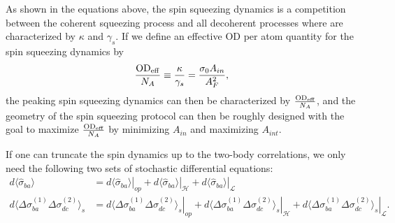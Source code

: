 \documentclass[preprint,aps,pra,onecolumn,superscriptaddress]{revtex4-1} %
\newcommand{\expect}[1]{\big\langle #1 \big\rangle}
\begin{document}
As shown in the equations above, the spin squeezing dynamics is a competition between the coherent squeezing process and all decoherent processes where are characterized by $\kappa$ and $\gamma_s$. 
If we define an effective OD per atom quantity for the spin squeezing dynamics by
\begin{align}
\frac{\mathrm{OD}_{\rm eff}}{N_A} \equiv \frac{\kappa}{\gamma_s}=\frac{\sigma_0A_{in}}{A_F^2},
\end{align}
the peaking spin squeezing dynamics can then be characterized by $\frac{\mathrm{OD}_{\rm eff}}{N_A}$, and the geometry of the spin squeezing protocol can then be roughly designed with the goal to maximize $\frac{\mathrm{OD}_{\rm eff}}{N_A}$ by minimizing $A_{in}$ and maximizing $A_{int}$.  


If one can truncate the spin dynamics up to the two-body correlations, we only need the following two sets of stochastic differential equations:
\begin{subequations}
\begin{align}
d\expect{\hat{\sigma}_{ba}} &=\left. d{\expect{\hat{\sigma}_{ba}}}\right|_{op} + \left. d{\expect{\hat{\sigma}_{ba}}}\right|_{\mathcal{H}}+\left. d{\expect{\hat{\sigma}_{ba}}}\right|_{\mathcal{L}} \\
d\expect{\Delta \sigma_{ba}^{(1)}\Delta \sigma_{dc}^{(2)}}_s &= \left. d{\expect{\Delta \sigma_{ba}^{(1)}\Delta \sigma_{dc}^{(2)}}_s}\right|_{op} + \left. d{\expect{\Delta \sigma_{ba}^{(1)}\Delta \sigma_{dc}^{(2)}}_s}\right|_{\mathcal{H}} + \left. d{\expect{\Delta \sigma_{ba}^{(1)}\Delta \sigma_{dc}^{(2)}}_s}\right|_{\mathcal{L}}.
\end{align}
\end{subequations}
\end{document}
